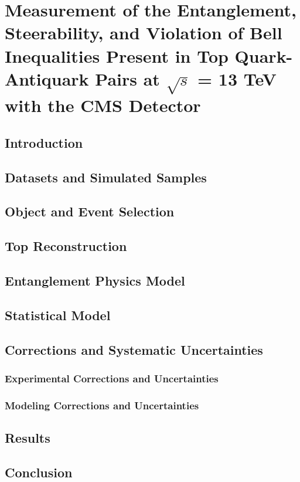 
\chapter{Measurement of the Entanglement, Steerability, and Violation of Bell Inequalities Present in Top Quark-Antiquark Pairs at $\sqrt{s}$ = 13 TeV with the CMS Detector}
\label{ch:HierarchyFullRunII}

\section{Introduction}

\section{Datasets and Simulated Samples}

\section{Object and Event Selection}

\section{Top Reconstruction}

\section{Entanglement Physics Model}

\section{Statistical Model}

\section{Corrections and Systematic Uncertainties}

\subsection{Experimental Corrections and Uncertainties}

\subsection{Modeling Corrections and Uncertainties}

\section{Results}

\section{Conclusion}